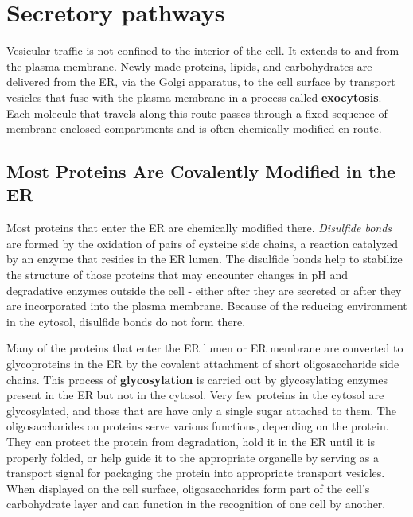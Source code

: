 \section{Secretory pathways}

Vesicular traffic is not confined to the interior of the cell. It extends to
and from the plasma membrane. Newly made proteins, lipids, and carbohydrates 
are delivered from the ER, via the Golgi apparatus, to the cell
surface by transport vesicles that fuse with the plasma membrane in a
process called \textbf{exocytosis}. Each molecule that travels along this route
passes through a fixed sequence of membrane-enclosed compartments
and is often chemically modified en route.

\subsection{Most Proteins Are Covalently Modified in the ER}

Most proteins that enter the ER are chemically modified there. \textit{Disulfide
bonds} are formed by the oxidation of pairs of cysteine side chains, 
a reaction catalyzed by an enzyme that resides in the ER
lumen. The disulfide bonds help to stabilize the structure of those proteins
that may encounter changes in pH and degradative enzymes outside the
cell - either after they are secreted or after they are incorporated into the
plasma membrane. Because of the reducing environment in the cytosol,
disulfide bonds do not form there.

Many of the proteins that enter the ER lumen or ER membrane are converted 
to glycoproteins in the ER by the covalent attachment of short
oligosaccharide side chains. This process of \textbf{glycosylation} is carried out
by glycosylating enzymes present in the ER but not in the cytosol. Very
few proteins in the cytosol are glycosylated, and those that are have only
a single sugar attached to them. The oligosaccharides on proteins serve
various functions, depending on the protein. They can protect the protein
from degradation, hold it in the ER until it is properly folded, or help guide
it to the appropriate organelle by serving as a transport signal for packaging 
the protein into appropriate transport vesicles. When displayed
on the cell surface, oligosaccharides form part of the cell’s carbohydrate
layer and can function in the recognition of one cell by another.

